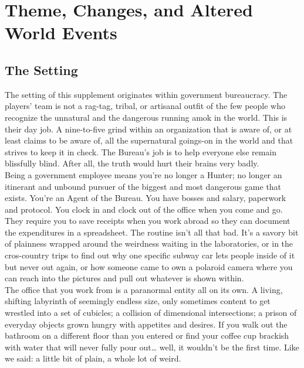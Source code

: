 \documentclass[10pt,oneside,landscape]{memoir}
\begin{document}
\chapter*{Theme, Changes, and Altered World Events}
\begin{multicols}{2}

\section*{The Setting}
The setting of this supplement originates within government bureaucracy.  The players’ team is not a rag-tag, tribal, or artisanal outfit of the few people who recognize the unnatural and the dangerous running amok in the world.  This is their day job.  A nine-to-five grind within an organization that is aware of, or at least claims to be aware of, all the supernatural goings-on in the world and that strives to keep it in check.  The Bureau’s job is to help everyone else remain blissfully blind.  After all, the truth would hurt their brains very badly.
\\[4mm]
Being a government employee means you’re no longer a Hunter; no longer an itinerant and unbound pursuer of the biggest and most dangerous game that exists.  You’re an Agent of the Bureau.  You have bosses and salary, paperwork and protocol.  You clock in and clock out of the office when you come and go.  They require you to save receipts when you work abroad so they can document the expenditures in a spreadsheet.  The routine isn’t all that bad.  It’s a savory bit of plainness wrapped around the weirdness waiting in the laboratories, or in the cros-country trips to find out why one specific subway car lets people inside of it but never out again, or how someone came to own a polaroid camera where you can reach into the pictures and pull out whatever is shown within.
\\[4mm]
The office that you work from is a paranormal entity all on its own.  A living, shifting labyrinth of seemingly endless size, only sometimes content to get wrestled into a set of cubicles; a collision of dimensional intersections; a prison of everyday objects grown hungry with appetites and desires.  If you walk out the bathroom on a different floor than you entered or find your coffee cup brackish with water that will never fully pour out… well, it wouldn’t be the first time.  Like we said: a little bit of plain, a whole lot of weird.


\end{multicols}
\end{document}
